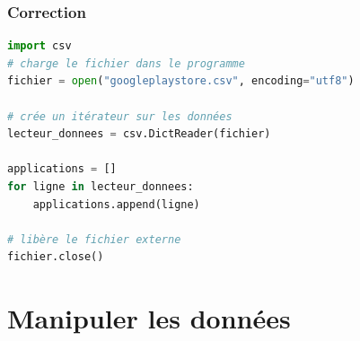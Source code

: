 \documentclass[svgnames,11pt]{beamer}
\begin{document}
\begin{frame}[fragile]
    \frametitle{Correction}

    \begin{center}
        \begin{lstlisting}[language=Python, xleftmargin=1em,xrightmargin=1em,basicstyle=\ttfamily\small]
import csv
# charge le fichier dans le programme
fichier = open("googleplaystore.csv", encoding="utf8")

# crée un itérateur sur les données
lecteur_donnees = csv.DictReader(fichier)

applications = []
for ligne in lecteur_donnees:
    applications.append(ligne)

# libère le fichier externe
fichier.close()
\end{lstlisting}
    \end{center}

\end{frame}

\section{Manipuler les données}
\end{document}

